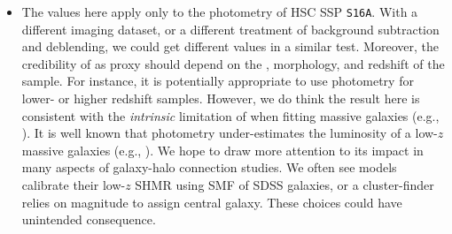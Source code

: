 \documentclass[a4paper,fleqn,usenatbib]{mnras}
\begin{document}
\begin{itemize}
        \item The \sighalo{} values here apply only to the \cmodel{} photometry of HSC SSP 
            \texttt{S16A}. With a different imaging dataset, or a different treatment of background
            subtraction and deblending, we could get different \sighalo{} values in a similar test.
            Moreover, the credibility of \mcmodel{} as \mvir{} proxy should depend on the \mstar{}, 
            morphology, and redshift of the sample. For instance, it is potentially appropriate 
            to use \cmodel{} photometry for lower-\mstar{} or higher redshift samples.
            However, we do think the result here is consistent with the \emph{intrinsic} 
            limitation of \cmodel{} when fitting massive galaxies (e.g., \addref{}).
            It is well known that \cmodel{} photometry under-estimates the luminosity of a low-$z$
            massive galaxies (e.g., \addref{}).
            We hope to draw more attention to its impact in many aspects of galaxy-halo connection
            studies. We often see models calibrate their low-$z$ SHMR using \cmodel{} SMF of SDSS 
            galaxies, or a cluster-finder relies on \cmodel{} magnitude to assign central galaxy.
            These choices could have unintended consequence. 
             
    \end{itemize}
\end{document}
